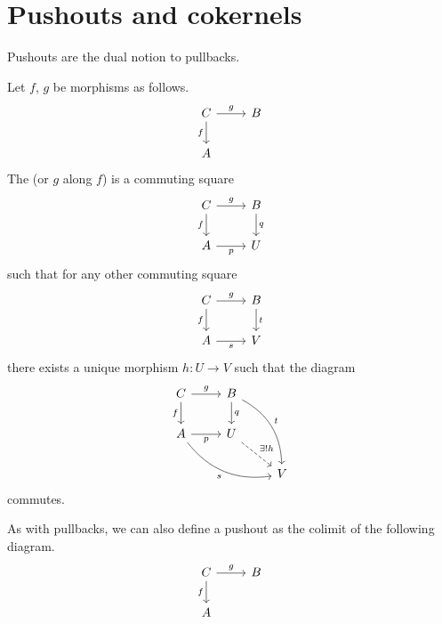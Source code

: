 \documentclass[main.tex]{subfiles}
\begin{document}
\section{Pushouts and cokernels}

Pushouts are the dual notion to pullbacks.
\begin{definition}[pushouts]
  \label{def:pushout}
  Let $f$, $g$ be morphisms as follows.
  \begin{equation*}
    \begin{tikzcd}
      C \arrow[r, "g"] \arrow[d, swap, "f"] & B \\
      A
    \end{tikzcd}
  \end{equation*}
  The  (or $g$ along $f$) is a commuting square
  \begin{equation*}
    \begin{tikzcd}
      C \arrow[r, "g"] \arrow[d, swap, "f"] & B \arrow[d, "q"] \\
      A \arrow[r, swap, "p"] & U
    \end{tikzcd}
  \end{equation*}
  such that for any other commuting square
  \begin{equation*}
    \begin{tikzcd}
      C \arrow[r, "g"] \arrow[d, swap, "f"] & B \arrow[d, "t"] \\
      A \arrow[r, swap, "s"] & V
    \end{tikzcd}
  \end{equation*}
  there exists a unique morphism $h\colon U \to V$ such that the diagram
  \begin{equation*}
    \begin{tikzcd}
      C \arrow[r, "g"] \arrow[d, swap, "f"] & B \arrow[d, "q"] \arrow[ddr, bend left, "t"] & \\
      A \arrow[drr, bend right, swap, "s"] \arrow[r, swap, "p"] & U \arrow[dr, dashed, "\exists!h"] & \\
      & & V
    \end{tikzcd}
  \end{equation*}
  commutes.
\end{definition}

\begin{note}
  As with pullbacks, we can also define a pushout as the colimit of the following diagram.
  \begin{equation*}
    \begin{tikzcd}
      C \arrow[r, "g"] \arrow[d, swap, "f"] & B \\
      A
    \end{tikzcd}
  \end{equation*}
\end{note}
\end{document}
